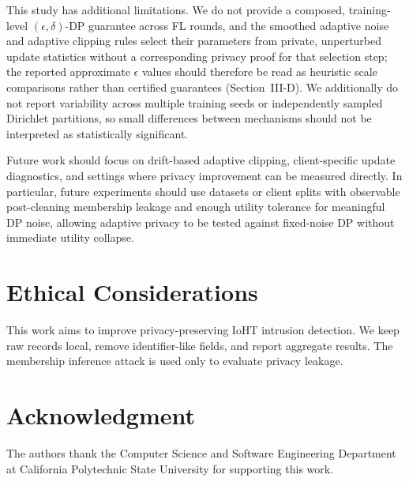 \documentclass[conference]{IEEEtran}
\begin{document}
This study has additional limitations. We do not provide a composed,
training-level \((\epsilon,\delta)\)-DP guarantee across FL rounds, and the
smoothed adaptive noise and adaptive clipping rules select their parameters
from private, unperturbed update statistics without a corresponding privacy
proof for that selection step; the reported approximate \(\epsilon\) values
should therefore be read as heuristic scale comparisons rather than certified
guarantees (Section~III-D). We additionally do not report variability across
multiple training seeds or independently sampled Dirichlet partitions, so small
differences between mechanisms should not be interpreted as statistically
significant.

Future work should focus on drift-based adaptive clipping, client-specific
update diagnostics, and settings where privacy improvement can be measured
directly. In particular, future experiments should use datasets or client splits
with observable post-cleaning membership leakage and enough utility tolerance
for meaningful DP noise, allowing adaptive privacy to be tested against
fixed-noise DP without immediate utility collapse.

\section{Ethical Considerations}

This work aims to improve privacy-preserving IoHT intrusion detection. We keep
raw records local, remove identifier-like fields, and report aggregate results.
The membership inference attack is used only to evaluate privacy leakage.

\section*{Acknowledgment}

The authors thank the Computer Science and Software Engineering Department at
California Polytechnic State University for supporting this work.
\end{document}
